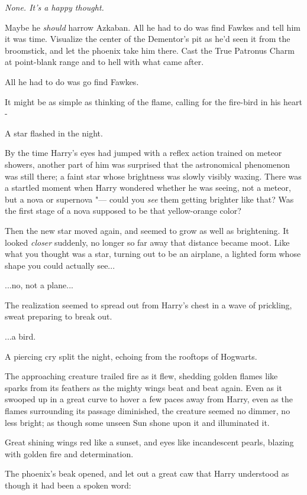 \emph{None. It's a happy thought.}

Maybe he \emph{should} harrow Azkaban. All he had to do was find Fawkes
and tell him it was time. Visualize the center of the Dementor's pit as
he'd seen it from the broomstick, and let the phoenix take him there.
Cast the True Patronus Charm at point-blank range and to hell with what
came after.

All he had to do was go find Fawkes.

It might be as simple as thinking of the flame, calling for the
fire-bird in his heart -

A star flashed in the night.

By the time Harry's eyes had jumped with a reflex action trained on
meteor showers, another part of him was surprised that the astronomical
phenomenon was still there; a faint star whose brightness was slowly
visibly waxing. There was a startled moment when Harry wondered whether
he was seeing, not a meteor, but a nova or supernova "--- could you
\emph{see} them getting brighter like that? Was the first stage of a
nova supposed to be that yellow-orange color?

Then the new star moved again, and seemed to grow as well as
brightening. It looked \emph{closer} suddenly, no longer so far away
that distance became moot. Like what you thought was a star, turning out
to be an airplane, a lighted form whose shape you could actually
see...

...no, not a plane...

The realization seemed to spread out from Harry's chest in a wave of
prickling, sweat preparing to break out.

...a bird.

A piercing cry split the night, echoing from the rooftops of Hogwarts.

The approaching creature trailed fire as it flew, shedding golden flames
like sparks from its feathers as the mighty wings beat and beat again.
Even as it swooped up in a great curve to hover a few paces away from
Harry, even as the flames surrounding its passage diminished, the
creature seemed no dimmer, no less bright; as though some unseen Sun
shone upon it and illuminated it.

Great shining wings red like a sunset, and eyes like incandescent
pearls, blazing with golden fire and determination.

The phoenix's beak opened, and let out a great caw that Harry understood
as though it had been a spoken word:

